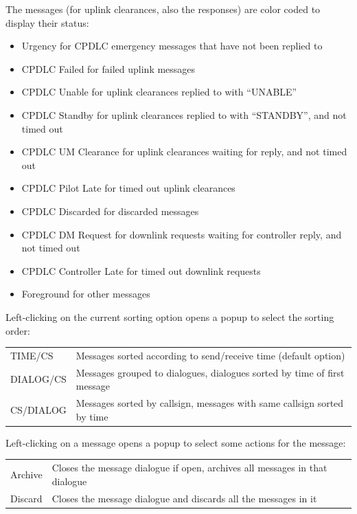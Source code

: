 \documentclass[a4paper,oneside,11pt]{memoir}
\newcommand{\colorref}[1]{\colorbox{Flight Highlight}{\color{#1}#1}}
\begin{document}
\bigskip

The messages (for uplink clearances, also the responses) are color coded to display their status:

\begin{itemize}
    \item \colorref{Urgency} for CPDLC emergency messages that have not been replied to
    \item \colorref{CPDLC Failed} for failed uplink messages
    \item \colorref{CPDLC Unable} for uplink clearances replied to with “UNABLE”
    \item \colorref{CPDLC Standby} for uplink clearances replied to with “STANDBY”, and not timed out
    \item \colorref{CPDLC UM Clearance} for uplink clearances waiting for reply, and not timed out
    \item \colorref{CPDLC Pilot Late} for timed out uplink clearances
    \item \colorref{CPDLC Discarded} for discarded messages
    \item \colorref{CPDLC DM Request} for downlink requests waiting for controller reply, and not timed out
    \item \colorref{CPDLC Controller Late} for timed out downlink requests
    \item \colorref{Foreground} for other messages
\end{itemize}

\bigskip

Left-clicking on the current sorting option opens a popup to select the sorting order:

\begin{longtable}{p{2.5cm} p{10cm}}
    TIME/CS     & Messages sorted according to send/receive time (default option)\\
    DIALOG/CS   & Messages grouped to dialogues, dialogues sorted by time of first message\\
    CS/DIALOG   & Messages sorted by callsign, messages with same callsign sorted by time\\
\end{longtable}

\bigskip

Left-clicking on a message opens a popup to select some actions for the message:

\begin{longtable}{p{2.5cm} p{10cm}}
    Archive & Closes the message dialogue if open, archives all messages in that dialogue\\
    Discard & Closes the message dialogue and discards all the messages in it\\
\end{longtable}
\end{document}
